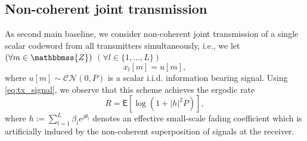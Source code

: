\documentclass[10pt,journal,a4paper]{IEEEtran}
\newcommand{\eqdef}{:=}
\newcommand{\E}{\mathsf{E}}		%
\newcommand{\stdset}[1]{\mathbbmss{#1}}	%
\newcommand{\CN}{\mathcal{CN}}			%
\begin{document}
\subsection{Non-coherent joint transmission}
As second main baseline, we consider non-coherent joint transmission of a single scalar codeword from all transmitters simultaneously, i.e., we let $(\forall m \in \stdset{Z})$ $(\forall l\in \{1,\ldots,L\})$
\begin{equation*}
x_l[m] = u[m],
\end{equation*}
where $u[m]\sim \CN(0,P)$ is a scalar i.i.d. information bearing signal.
Using \eqref{eq:tx_signal}, we observe that this scheme achieves the ergodic rate
\begin{equation}\label{eq:R_NCJT}
R = \E[\log(1+|h|^2P)],
\end{equation}
where $h \eqdef \sum_{l=1}^L\beta_le^{j\theta_l}$ denotes an effective small-scale fading coefficient which is artificially induced by the non-coherent superposition of signals at the receiver. 
\end{document}
